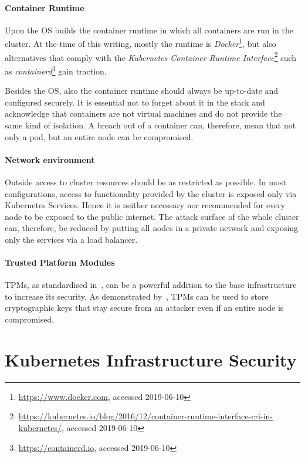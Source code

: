 \paragraph{Container Runtime}

Upon the OS builds the container runtime in which all containers are run in the cluster. At the time of this writing, mostly the runtime is \textit{Docker}\footnote{\url{https://www.docker.com}, accessed 2019-06-10}, but also alternatives that comply with the \textit{Kubernetes Container Runtime Interface}\footnote{\url{https://kubernetes.io/blog/2016/12/container-runtime-interface-cri-in-kubernetes/}, accessed 2019-06-10} such as \textit{containerd}\footnote{\url{https://containerd.io}, accessed 2019-06-10} gain traction.

Besides the OS, also the container runtime should always be up-to-date and configured securely. It is essential not to forget about it in the stack and acknowledge that containers are not virtual machines and do not provide the same kind of isolation. A breach out of a container can, therefore, mean that not only a pod, but an entire node can be compromised.

\paragraph{Network environment}

Outside access to cluster resources should be as restricted as possible. In most configurations, access to functionality provided by the cluster is exposed only via Kubernetes Services. Hence it is neither necessary nor recommended for every node to be exposed to the public internet. The attack surface of the whole cluster can, therefore, be reduced by putting all nodes in a private network and exposing only the services via a load balancer.

\paragraph{Trusted Platform Modules}

\acp{TPM}, as standardised in~\textcite{TPMStandard}, can be a powerful addition to the base infrastructure to increase its security. As demonstrated by~\textcite{TPM}, \acp{TPM} can be used to store cryptographic keys that stay secure from an attacker even if an entire node is compromised. 

\section{Kubernetes Infrastructure Security} \label{sec:layer2}

